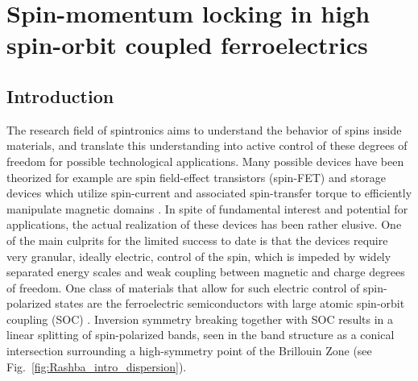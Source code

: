 \newcommand{\unkr}{$u_n(\bm{k}, \bm{r})$}
\newcommand{\Unkr}{u_n(\bm{k}, \bm{r})}
\newcommand{\eikr}{$e^{i\bm{k}\cdot\bm{r}}$}
\newcommand{\Eikr}{e^{i\bm{k}\cdot\bm{r}}}
\chapter{Spin-momentum locking in high spin-orbit coupled ferroelectrics}
\section{Introduction}
%
The research field of spintronics aims to understand the behavior of spins inside materials, and translate this understanding into active control of these degrees of freedom for possible technological applications.
Many possible devices have been theorized for example are spin field-effect transistors (spin-FET)\cite{Datta1990} and storage devices which utilize spin-current and associated spin-transfer torque to efficiently manipulate magnetic domains \cite{Kent2015,Jungwirth2016}. In spite of fundamental interest and potential for applications, the actual realization of these devices has been rather elusive.
One of the main culprits for the limited success to date is that the devices require very granular, ideally electric, control of the spin, which is impeded by widely separated energy scales and weak coupling between magnetic and charge degrees of freedom.
One class of materials that allow for such electric control of spin-polarized states are the ferroelectric semiconductors with large atomic spin-orbit coupling (SOC) \cite{DiSante2013,Ishizaka2011,Kim2014}.
Inversion symmetry breaking together with SOC results in a linear splitting of spin-polarized bands, seen in the band structure as a conical intersection surrounding a high-symmetry point of the Brillouin Zone (see Fig.~\ref{fig:Rashba_intro_dispersion}).
